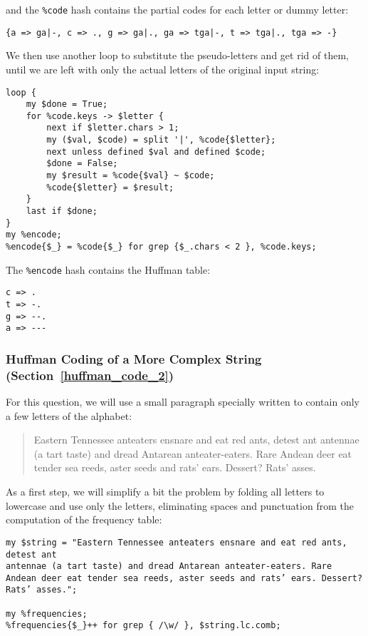 and the \verb'%code' hash contains the partial codes for each 
letter or dummy letter:

\begin{verbatim}
{a => ga|-, c => ., g => ga|., ga => tga|-, t => tga|., tga => -}
\end{verbatim}

We then use another loop to substitute the pseudo-letters and get 
rid of them, until we are left with only the actual letters of the 
original input string:

\begin{verbatim}
loop {   
    my $done = True;
    for %code.keys -> $letter {
        next if $letter.chars > 1;
        my ($val, $code) = split '|', %code{$letter};
        next unless defined $val and defined $code;
        $done = False;
        my $result = %code{$val} ~ $code;
        %code{$letter} = $result;
    }
    last if $done;
}
my %encode;
%encode{$_} = %code{$_} for grep {$_.chars < 2 }, %code.keys;
\end{verbatim}

The \verb'%encode' hash contains the Huffman table:

\begin{verbatim}
c => .
t => -.
g => --.
a => ---
\end{verbatim}

\subsubsection{Huffman Coding of a More Complex String (Section~\ref{huffman_code_2})}

For this question, we will use a small paragraph specially written 
to contain only a few letters of the alphabet:

\begin{quote}
Eastern Tennessee anteaters ensnare and eat red ants, detest ant
antennae (a tart taste) and dread Antarean anteater-eaters. Rare
Andean deer eat tender sea reeds, aster seeds and rats’ ears. Dessert?
Rats’ asses.
\end{quote}

As a first step, we will simplify a bit the problem by folding all 
letters to lowercase and use only the letters, eliminating spaces 
and punctuation from the computation of the frequency table:

\begin{verbatim}
my $string = "Eastern Tennessee anteaters ensnare and eat red ants, detest ant
antennae (a tart taste) and dread Antarean anteater-eaters. Rare
Andean deer eat tender sea reeds, aster seeds and rats’ ears. Dessert?
Rats’ asses."; 

my %frequencies;
%frequencies{$_}++ for grep { /\w/ }, $string.lc.comb;
\end{verbatim}


